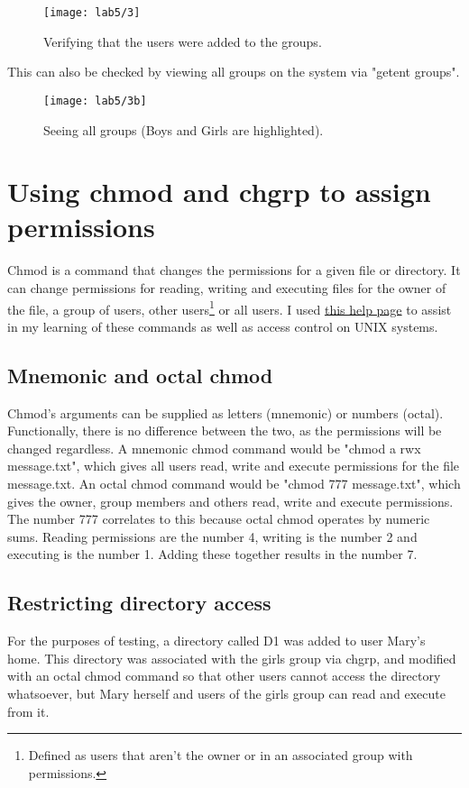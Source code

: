 \begin{figure}[H]
    \centering
    \texttt{[image: lab5/3]}
    \caption{Verifying that the users were added to the groups.}
    \label{fig:checkGroups}
\end{figure}

This can also be checked by viewing all groups on the system via "getent groups".

\begin{figure}[H]
    \centering
    \texttt{[image: lab5/3b]}
    \caption{Seeing all groups (Boys and Girls are highlighted).}
    \label{fig:getent}
\end{figure}

\pagebreak

\section{Using chmod and chgrp to assign permissions}\label{sec:using-chmod}
Chmod is a command that changes the permissions for a given file or directory.
It can change permissions for reading, writing and executing files for the owner of the file,
a group of users, other users\footnote{Defined as users that aren't the owner or in an
associated group with permissions.} or all users.
I used \href{https://docs.nersc.gov/filesystems/unix-file-permissions/}{this help page}
\autocite{chmodHelp} to assist in my learning of these commands as well as access control on UNIX
systems.

\subsection{Mnemonic and octal chmod}\label{subsec:mnemonic-and-octal-chmod}
Chmod's arguments can be supplied as letters (mnemonic) or numbers (octal).
Functionally, there is no difference between the two, as the permissions will be changed regardless.
A mnemonic chmod command would be "chmod a \+rwx message.txt", which gives all users read, write
and execute permissions for the file message.txt.
An octal chmod command would be "chmod 777 message.txt", which gives the owner, group members
and others read, write and execute permissions.
The number 777 correlates to this because octal chmod operates by numeric sums.
Reading permissions are the number 4, writing is the number 2 and executing is the number 1.
Adding these together results in the number 7.

\subsection{Restricting directory access}\label{subsec:chgrp}
For the purposes of testing, a directory called D1 was added to user Mary's home.
This directory was associated with the girls group via chgrp, and modified with an octal chmod
command so that other users cannot access the directory whatsoever, but Mary herself and users
of the girls group can read and execute from it.

